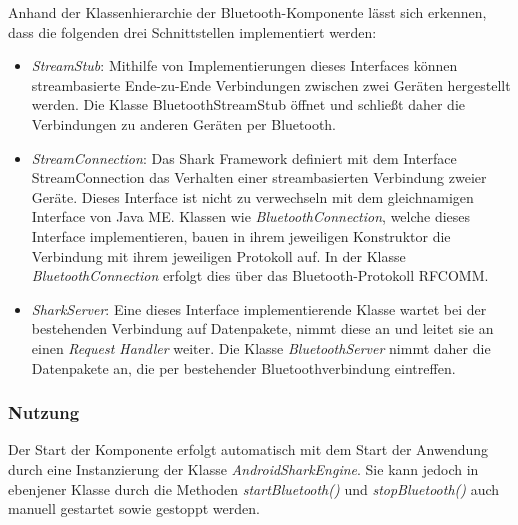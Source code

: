 Anhand der Klassenhierarchie der Bluetooth-Komponente lässt sich erkennen, dass die folgenden drei Schnittstellen implementiert werden:
\begin{itemize}
	\item \textit{StreamStub}: Mithilfe von Implementierungen dieses Interfaces können streambasierte Ende-zu-Ende Verbindungen zwischen zwei Geräten hergestellt werden. Die Klasse BluetoothStreamStub öffnet und schließt daher die Verbindungen zu anderen Geräten per Bluetooth.
	\item \textit{StreamConnection}: Das Shark Framework definiert mit dem Interface StreamConnection das Verhalten einer streambasierten Verbindung zweier Geräte. Dieses Interface ist nicht zu verwechseln mit dem gleichnamigen Interface von Java ME. Klassen wie \textit{BluetoothConnection}, welche dieses Interface implementieren, bauen in ihrem jeweiligen Konstruktor die Verbindung mit ihrem jeweiligen Protokoll auf. In der Klasse \textit{BluetoothConnection} erfolgt dies über das Bluetooth-Protokoll RFCOMM.
	\item \textit{SharkServer}: Eine dieses Interface implementierende Klasse wartet bei der bestehenden Verbindung auf Datenpakete, nimmt diese an und leitet sie an einen \textit{Request Handler} weiter. Die Klasse \textit{BluetoothServer} nimmt daher die Datenpakete an, die per bestehender Bluetoothverbindung eintreffen.

\end{itemize}

\subsubsection{Nutzung}
Der Start der Komponente erfolgt automatisch mit dem Start der Anwendung durch eine Instanzierung der Klasse \textit{AndroidSharkEngine}. Sie kann jedoch in ebenjener Klasse durch die Methoden \textit{startBluetooth()} und \textit{stopBluetooth()} auch manuell gestartet sowie gestoppt werden.

